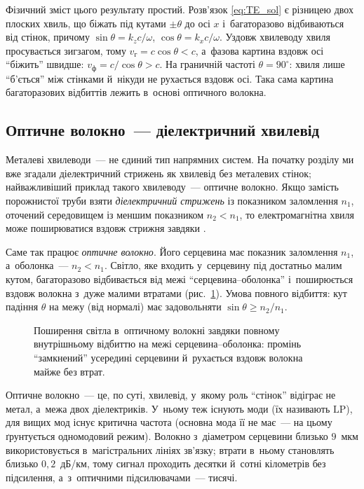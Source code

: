 Фізичний зміст цього результату простий. Розв'язок \eqref{eq:TE_sol} є різницею двох плоских хвиль, що біжать під кутами $\pm\theta$ до осі $x$ і~багаторазово відбиваються від стінок, причому $\sin\theta=k_zc/\omega$, $\cos\theta=k_xc/\omega$. Уздовж хвилеводу хвиля просувається зигзагом, тому $v_\text{г}=c\cos\theta<c$, а~фазова картина вздовж осі \enquote{біжить} швидше: $v_\text{ф}=c/\cos\theta>c$. На граничній частоті $\theta=90^\circ$: хвиля лише \enquote{б'ється} між стінками й~нікуди не рухається вздовж осі. Така сама картина багаторазових відбиттів лежить в~основі оптичного волокна.


\subsection*{Оптичне волокно~--- діелектричний хвилевід}

Металеві хвилеводи~--- не єдиний тип напрямних систем. На початку розділу ми вже згадали діелектричний стрижень як хвилевід без металевих стінок; найважливіший приклад такого хвилеводу~--- оптичне волокно. Якщо замість порожнистої труби взяти \emph{діелектричний стрижень} із показником заломлення $n_1$, оточений середовищем із меншим показником $n_2 < n_1$, то електромагнітна хвиля може поширюватися вздовж стрижня завдяки .

Саме так працює \emph{оптичне волокно}. Його серцевина має показник заломлення $n_1$, а~оболонка~--- $n_2 < n_1$. Світло, яке входить у~серцевину під достатньо малим кутом, багаторазово відбивається від межі \enquote{серцевина--оболонка} і~поширюється вздовж волокна з~дуже малими втратами (рис.~\ref{pic:fiber_tir}). Умова повного відбиття: кут падіння $\theta$ на межу (від нормалі) має задовольняти $\sin\theta\geqslant n_2/n_1$.

\begin{figure}[h!]
	\centering
	\caption{Поширення світла в~оптичному волокні завдяки повному внутрішньому відбиттю на межі серцевина--оболонка: промінь \enquote{замкнений} усередині серцевини й~рухається вздовж волокна майже без втрат.}
	\label{pic:fiber_tir}
\end{figure}

Оптичне волокно~--- це, по суті, хвилевід, у~якому роль \enquote{стінок} відіграє не метал, а~межа двох діелектриків. У~ньому теж існують моди (їх називають $\text{LP}$), для вищих мод існує критична частота (основна мода її не має~--- на цьому ґрунтується одномодовий режим). Волокно з~діаметром серцевини близько $9$~мкм використовується в~магістральних лініях зв'язку; втрати в~ньому становлять близько $0{,}2$~дБ/км, тому сигнал проходить десятки й~сотні кілометрів без підсилення, а~з~оптичними підсилювачами~--- тисячі.


